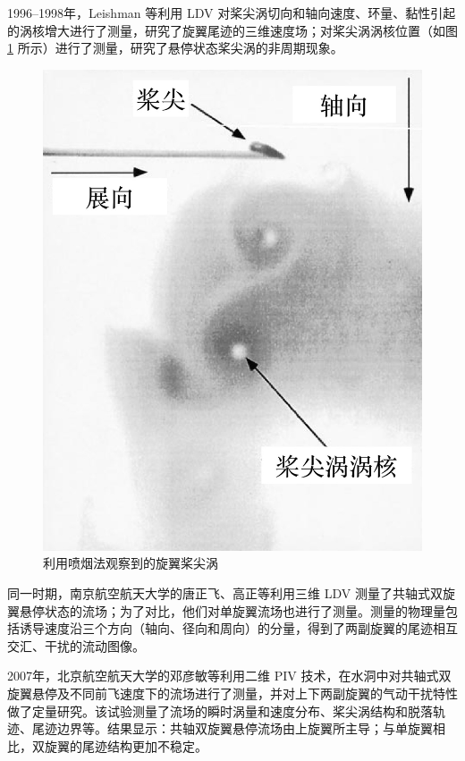 1996–1998年，Leishman 等利用 LDV 对桨尖涡切向和轴向速度、环量、黏性引起的涡核增大进行了测量，研究了旋翼尾迹的三维速度场；对桨尖涡涡核位置（如图
\ref{fig:tip-vortex-core} 所示）进行了测量，研究了悬停状态桨尖涡的非周期现象。
\begin{figure}[h!]
\begin{centering}
\includegraphics[height=0.26\textheight]{../review/figures/tip-vortex}
\par\end{centering}
\caption{\label{fig:tip-vortex-core}利用喷烟法观察到的旋翼桨尖涡}
\end{figure}

同一时期，南京航空航天大学的唐正飞、高正等利用三维 LDV 测量了共轴式双旋翼悬停状态的流场；为了对比，他们对单旋翼流场也进行了测量。测量的物理量包括诱导速度沿三个方向（轴向、径向和周向）的分量，得到了两副旋翼的尾迹相互交汇、干扰的流动图像。

2007年，北京航空航天大学的邓彦敏等利用二维 PIV 技术，在水洞中对共轴式双旋翼悬停及不同前飞速度下的流场进行了测量，并对上下两副旋翼的气动干扰特性做了定量研究。该试验测量了流场的瞬时涡量和速度分布、桨尖涡结构和脱落轨迹、尾迹边界等。结果显示：共轴双旋翼悬停流场由上旋翼所主导；与单旋翼相比，双旋翼的尾迹结构更加不稳定。


